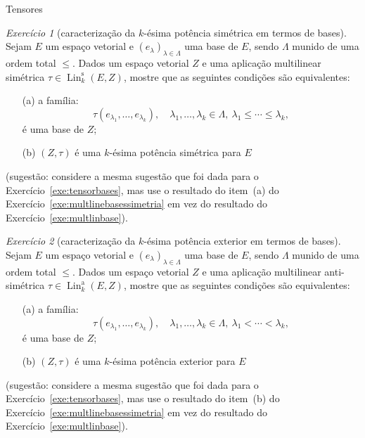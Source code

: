 \documentclass[oneside,11pt]{amsart}
\DeclareMathOperator{\Lin}{Lin}
\theoremstyle{remark}\newtheorem{exercise}{Exercício}[section]
\theoremstyle{plain}\newtheorem{teo}{Teorema}[section]
\theoremstyle{plain}\newtheorem{lem}[teo]{Lema}
\theoremstyle{plain}\newtheorem{prop}[teo]{Proposição}
\theoremstyle{definition}\newtheorem{defin}[teo]{Definição}
\theoremstyle{remark}\newtheorem{rem}[teo]{Observação}
\theoremstyle{definition}\newtheorem{example}[teo]{Exemplo}
\numberwithin{equation}{section}
\begin{document}
\begin{section}{Tensores}
\begin{exercise}[caracterização da $k$-ésima potência simétrica em termos de bases]\label{exe:simetricobases}
Sejam $E$ um espaço vetorial e $(e_\lambda)_{\lambda\in\Lambda}$ uma base de $E$, sendo $\Lambda$ munido de uma ordem total $\le$.
Dados um espaço vetorial $Z$ e uma aplicação multilinear simétrica $\tau\in\Lin_k^{\mathrm s}(E,Z)$, mostre que as seguintes condições são equivalentes:
\begin{itemize}
\item[(a)] a família:
\[\tau(e_{\lambda_1},\ldots,e_{\lambda_k}),\quad\lambda_1,\ldots,\lambda_k\in\Lambda,\ \lambda_1\le\cdots\le\lambda_k,\]
é uma base de $Z$;
\item[(b)] $(Z,\tau)$ é uma $k$-ésima potência simétrica para $E$
\end{itemize}
(sugestão: considere a mesma sugestão que foi dada para o Exercício~\ref{exe:tensorbases}, mas use o resultado do item~(a) do
Exercício~\ref{exe:multlinebasessimetria} em vez do resultado do Exercício~\ref{exe:multlinbase}).
\end{exercise}

\begin{exercise}[caracterização da $k$-ésima potência exterior em termos de bases]\label{exe:asimetricobases}
Sejam $E$ um espaço vetorial e $(e_\lambda)_{\lambda\in\Lambda}$ uma base de $E$, sendo $\Lambda$ munido de uma ordem total $\le$.
Dados um espaço vetorial $Z$ e uma aplicação multilinear anti-simétrica $\tau\in\Lin_k^{\mathrm a}(E,Z)$, mostre que as seguintes condições são equivalentes:
\begin{itemize}
\item[(a)] a família:
\[\tau(e_{\lambda_1},\ldots,e_{\lambda_k}),\quad\lambda_1,\ldots,\lambda_k\in\Lambda,\ \lambda_1<\cdots<\lambda_k,\]
é uma base de $Z$;
\item[(b)] $(Z,\tau)$ é uma $k$-ésima potência exterior para $E$
\end{itemize}
(sugestão: considere a mesma sugestão que foi dada para o Exercício~\ref{exe:tensorbases}, mas use o resultado do item~(b) do
Exercício~\ref{exe:multlinebasessimetria} em vez do resultado do Exercício~\ref{exe:multlinbase}).
\end{exercise}


\end{section}
\end{document}
